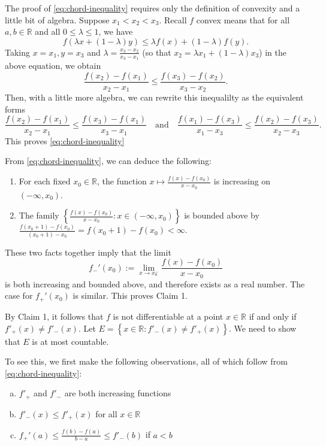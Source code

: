 \documentclass[answers]{exam}
\theoremstyle{problemstyle}
\newcommand{\1}[1]{\textbf{1}_{\left[#1\right]}} %
\def\R{\mathbb{R}} %
\begin{document}
\begin{questions}
\begin{solution}
The proof of \eqref{eq:chord-inequality} requires only the definition of convexity and a little bit of algebra.  Suppose $x_{1}<x_{2}<x_{3}$. Recall $f$ convex means that for all $a,b\in \R$ and all $0\leq \lambda\leq 1$, we have
  \begin{equation*}
    f(\lambda x + (1-\lambda)y)\leq \lambda f(x) + (1-\lambda)f(y).
  \end{equation*}
  Taking $x=x_{1}, y=x_{3}$ and $\lambda=\frac{x_{3}-x_{2}}{x_{3}-x_{1}}$ (so that $x_{2}= \lambda x_{1} + (1-\lambda)x_{3}$) in the above equation, we obtain 
\begin{equation*}
  \frac{f(x_{2})-f(x_{1})}{x_{2}-x_{1}}\leq \frac{f(x_{3})-f(x_{2})}{x_{3}-x_{2}}.
\end{equation*}
Then, with a little more algebra, we can rewrite this inequalilty as the equivalent forms
\begin{equation*}
  \frac{f(x_{2})-f(x_{1})}{x_{2}-x_{1}}\leq \frac{f(x_{3})-f(x_{1})}{x_{3}-x_{1}} \quad \text{and}\quad \frac{f(x_{1})-f(x_{3})}{x_{1}-x_{3}}\leq \frac{f(x_{2})-f(x_{3})}{x_{2}-x_{3}}.
\end{equation*}
This proves \eqref{eq:chord-inequality}

From \eqref{eq:chord-inequality}, we can deduce the following:
\begin{enumerate}
\item For each fixed $x_{0}\in \R$, the function $x\mapsto \frac{f(x)-f(x_{0})}{x-x_{0}}$ is increasing on $(-\infty,x_{0})$.
\item The family $\left\{   \frac{f(x)-f(x_{0})}{x-x_{0}}:  x\in (-\infty,x_{0})\right\}$ is bounded above by $\frac{f(x_{0}+1)-f(x_{0})}{(x_{0}+1)-x_{0}} = f(x_{0}+1)-f(x_{0})<\infty$.
\end{enumerate}
These two facts together imply that the limit
\begin{equation*}
  f_{-}'(x_{0}):=\lim_{x\to x_{0}^{-}}\frac{f(x)-f(x_{0})}{x-x_{0}}
\end{equation*}
is both increasing and bounded above, and therefore exists as a real number. The case for $f_{+}'(x_{0})$ is similar. This proves Claim 1.



By Claim 1, it follows that $f$ is not differentiable at a point $x\in \R$ if and only if $f'_{+}(x)\neq f'_{-}(x)$. Let $E=\left\{ x\in \R : f'_{-}(x)\neq f'_{+}(x) \right\}$. We need to show that $E$ is at most countable.


To see this, we first make the following observations, all of which follow from \eqref{eq:chord-inequality}:
\begin{enumerate}[(a)]
\item \label{item:3} $f'_{+}$ and $f'_{-}$ are both increasing functions
\item \label{item:5} $f'_{-}(x)\leq f'_{+}(x)$ for all $x\in\R$
\item \label{item:4} $f_{+}'(a) \leq \frac{f(b)-f(a)}{b-a}\leq f'_{-}(b)$ if $a<b$
\end{enumerate}


\end{solution}
\end{questions}
\end{document}

